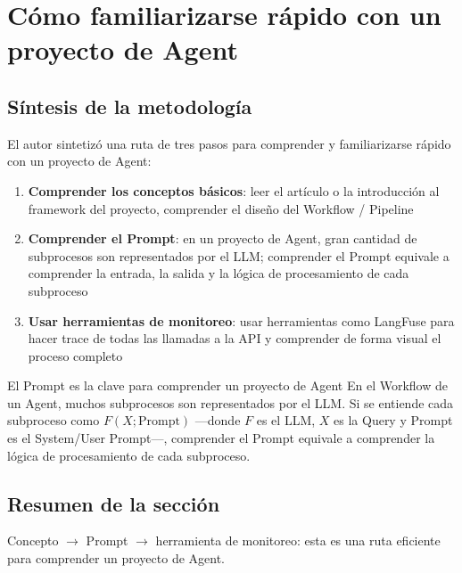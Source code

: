 \section{Cómo familiarizarse rápido con un proyecto de Agent}

\subsection{Síntesis de la metodología}

El autor sintetizó una ruta de tres pasos para comprender y familiarizarse rápido con un proyecto de Agent:

\begin{enumerate}
    \item \textbf{Comprender los conceptos básicos}: leer el artículo o la introducción al framework del proyecto, comprender el diseño del Workflow / Pipeline
    \item \textbf{Comprender el Prompt}: en un proyecto de Agent, gran cantidad de subprocesos son representados por el LLM; comprender el Prompt equivale a comprender la entrada, la salida y la lógica de procesamiento de cada subproceso
    \item \textbf{Usar herramientas de monitoreo}: usar herramientas como LangFuse para hacer trace de todas las llamadas a la API y comprender de forma visual el proceso completo
\end{enumerate}

\begin{knowledgebox}{El Prompt es la clave para comprender un proyecto de Agent}
En el Workflow de un Agent, muchos subprocesos son representados por el LLM. Si se entiende cada subproceso como $F(X; \text{Prompt})$ —donde $F$ es el LLM, $X$ es la Query y Prompt es el System/User Prompt—, comprender el Prompt equivale a comprender la lógica de procesamiento de cada subproceso.
\end{knowledgebox}

\subsection{Resumen de la sección}

Concepto $\rightarrow$ Prompt $\rightarrow$ herramienta de monitoreo: esta es una ruta eficiente para comprender un proyecto de Agent.

